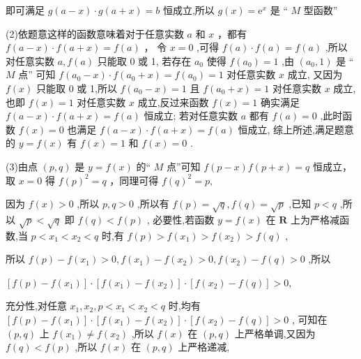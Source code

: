 \documentclass[10pt]{article}
\begin{document}
即可满足 \(g\left( {a - x}\right)  \cdot  g\left( {a + x}\right)  = b\) 恒成立,所以 \(g\left( x\right)  = {\mathrm{e}}^{x}\) 是 “ \(M\) 型函数”

(2)依题意这样的函数意味着对于任意实数 \(a\) 和 \(x\) ，都有 \(f\left( {a - x}\right)  \cdot  f\left( {a + x}\right)  = f\left( a\right)\) ， 令 \(x = 0\) ,可得 \(f\left( a\right)  \cdot  f\left( a\right)  = f\left( a\right)\) ,所以对任意实数 \(a,f\left( a\right)\) 只能取 0 或 1, 若存在 \({a}_{0}\) 使得 \(f\left( {a}_{0}\right)  = 1\) ,由 \(\left( {{a}_{0},1}\right)\) 是 “ \(M\) 点” 可知 \(f\left( {{a}_{0} - x}\right)  \cdot  f\left( {{a}_{0} + x}\right)  = f\left( {a}_{0}\right)  = 1\) 对任意实数 \(x\) 成立, 又因为 \(f\left( x\right)\) 只能取 0 或 1,所以 \(f\left( {{a}_{0} - x}\right)  = 1\) 且 \(f\left( {{a}_{0} + x}\right)  = 1\) 对任意实数 \(x\) 成立, 也即 \(f\left( x\right)  = 1\) 对任意实数 \(x\) 成立,反过来函数 \(f\left( x\right)  = 1\) 确实满足 \(f\left( {a - x}\right)  \cdot  f\left( {a + x}\right)  = f\left( a\right)\) 恒成立; 若对任意实数 \(a\) 都有 \(f\left( a\right)  = 0\) ,此时函数 \(f\left( x\right)  = 0\) 也满足 \(f\left( {a - x}\right)  \cdot  f\left( {a + x}\right)  = f\left( a\right)\) 恒成立, 综上所述,满足题意的 \(y = f\left( x\right)\) 有 \(f\left( x\right)  = 1\) 和 \(f\left( x\right)  = 0\) .

(3)由点 \(\left( {p,q}\right)\) 是 \(y = f\left( x\right)\) 的“ \(M\) 点”可知 \(f\left( {p - x}\right) f\left( {p + x}\right)  = q\) 恒成立，取 \(x = 0\) 得 \(f{\left( p\right) }^{2} = q\) ，同理可得 \(f{\left( q\right) }^{2} = p,\)

因为 \(f\left( x\right)  > 0\) ,所以 \(p,q > 0\) ,所以有 \(f\left( p\right)  = \sqrt{q},f\left( q\right)  = \sqrt{p}\) ,已知 \(p < q\) ,所以 \(\sqrt{p} < \sqrt{q}\) 即 \(f\left( q\right)  < f\left( p\right)\) , 必要性,若函数 \(y = f\left( x\right)\) 在 \(\mathbf{R}\) 上为严格减函数,当 \(p < {x}_{1} < {x}_{2} < q\) 时,有 \(f\left( p\right)  > f\left( {x}_{1}\right)  > f\left( {x}_{2}\right)  > f\left( q\right)\) ,

所以 \(f\left( p\right)  - f\left( {x}_{1}\right)  > 0,f\left( {x}_{1}\right)  - f\left( {x}_{2}\right)  > 0,f\left( {x}_{2}\right)  - f\left( q\right)  > 0\) ,所以

\(\left\lbrack  {f\left( p\right)  - f\left( {x}_{1}\right) }\right\rbrack   \cdot  \left\lbrack  {f\left( {x}_{1}\right)  - f\left( {x}_{2}\right) }\right\rbrack   \cdot  \left\lbrack  {f\left( {x}_{2}\right)  - f\left( q\right) }\right\rbrack   > 0,\)

充分性,对任意 \({x}_{1},{x}_{2},p < {x}_{1} < {x}_{2} < q\) 时,均有 \(\left\lbrack  {f\left( p\right)  - f\left( {x}_{1}\right) }\right\rbrack   \cdot  \left\lbrack  {f\left( {x}_{1}\right)  - f\left( {x}_{2}\right) }\right\rbrack   \cdot  \left\lbrack  {f\left( {x}_{2}\right)  - f\left( q\right) }\right\rbrack   > 0\) , 可知在 \(\left( {p,q}\right)\) 上 \(f\left( {x}_{1}\right)  \neq  f\left( {x}_{2}\right)\) ,所以 \(f\left( x\right)\) 在 \(\left( {p,q}\right)\) 上严格单调,又因为 \(f\left( q\right)  < f\left( p\right)\) ,所以 \(f\left( x\right)\) 在 \(\left( {p,q}\right)\) 上严格递减,
\end{document}
